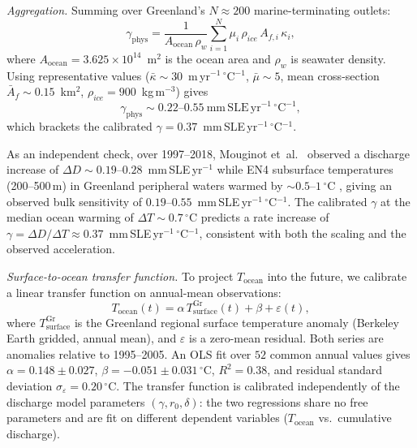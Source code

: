 \documentclass[12pt]{article}
\begin{document}
\textit{Aggregation.} Summing over Greenland's $N \approx 200$ marine-terminating outlets:
\begin{equation}
	\gamma_{\mathrm{phys}} = \frac{1}{A_{\mathrm{ocean}}\,\rho_w}\sum_{i=1}^{N} \mu_i\,\rho_{ice}\,A_{f,i}\,\kappa_i,
	\label{eq:gamma_aggregate}
\end{equation}
where $A_{\mathrm{ocean}} = 3.625 \times 10^{14}$~m$^2$ is the ocean area and $\rho_w$ is seawater density. Using representative values ($\bar{\kappa} \sim 30$~m\,yr$^{-1}$\,$^\circ$C$^{-1}$, $\bar{\mu} \sim 5$, mean cross-section $\bar{A}_f \sim 0.15$~km$^2$, $\rho_{ice} = 900$~kg\,m$^{-3}$) gives
\begin{equation}
	\gamma_{\mathrm{phys}} \sim 0.22\text{--}0.55~\mathrm{mm\,SLE\,yr}^{-1}\,{}^\circ\mathrm{C}^{-1},
	\label{eq:gamma_estimate}
\end{equation}
which brackets the calibrated $\gamma = 0.37$~mm\,SLE\,yr$^{-1}$\,$^\circ$C$^{-1}$.

As an independent check, over 1997--2018, Mouginot et~al.~\citep{Mouginot2019} observed a discharge increase of $\Delta D {\sim}0.19$--$0.28$~mm\,SLE\,yr$^{-1}$ while EN4 subsurface temperatures (200--500\,m) in Greenland peripheral waters warmed by ${\sim}0.5$--$1\,^\circ$C \citep{Good2013}, giving an observed bulk sensitivity of $0.19$--$0.55$~mm\,SLE\,yr$^{-1}$\,$^\circ$C$^{-1}$. The calibrated $\gamma$ at the median ocean warming of $\Delta T{\sim}0.7\,^\circ$C predicts a rate increase of $\gamma = \Delta D/\Delta T \approx 0.37$~mm\,SLE\,yr$^{-1}$\,$^\circ$C$^{-1}$, consistent with both the scaling and the observed acceleration.

\textit{Surface-to-ocean transfer function.} To project $T_{\mathrm{ocean}}$ into the future, we calibrate a linear transfer function on annual-mean observations:
\begin{equation}
	T_{\mathrm{ocean}}(t) = \alpha\,T_{\mathrm{surface}}^{\mathrm{Gr}}(t) + \beta + \varepsilon(t),
	\label{eq:ocean_transfer}
\end{equation}
where $T_{\mathrm{surface}}^{\mathrm{Gr}}$ is the Greenland regional surface temperature anomaly (Berkeley Earth gridded, annual mean), and $\varepsilon$ is a zero-mean residual. Both series are anomalies relative to 1995--2005. An OLS fit over $52$ common annual values gives $\alpha = 0.148 \pm 0.027$, $\beta = -0.051 \pm 0.031\,^\circ$C, $R^2 = 0.38$, and residual standard deviation $\sigma_\varepsilon = 0.20\,^\circ$C. The transfer function is calibrated independently of the discharge model parameters $(\gamma, r_0, \delta)$: the two regressions share no free parameters and are fit on different dependent variables ($T_{\mathrm{ocean}}$ vs.\ cumulative discharge).
\end{document}
